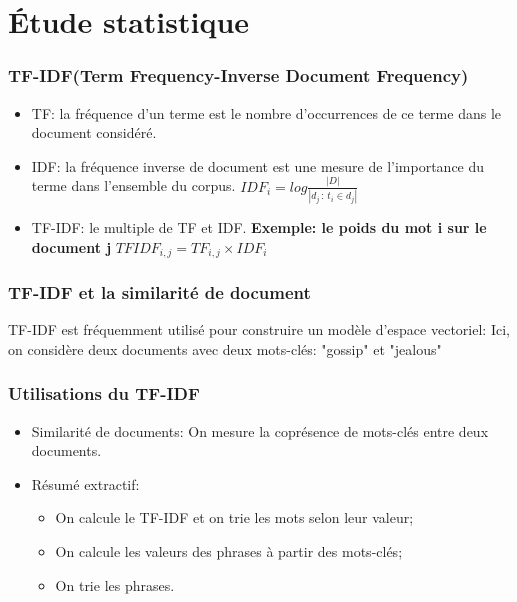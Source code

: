 \documentclass{beamer}
\begin{document}
\section{Étude statistique}
    \begin{frame}
    \frametitle{TF-IDF(Term Frequency-Inverse Document Frequency)}
        \begin{itemize}
            \item TF: la fréquence d'un terme est le nombre d'occurrences de ce terme dans le document considéré.
            \item IDF: la fréquence inverse de document est une mesure de l'importance du terme dans l'ensemble du corpus.
                $IDF_{i}=log \frac{|D|}{|d_{j}\,:\,t_{i}\in d_{j}|}$
            \item TF-IDF: le multiple de TF et IDF.\newline{}
                \textbf{Exemple: le poids du mot i sur le document j}
                $TFIDF_{i,j} = TF_{i,j} \times IDF_{i}$
        \end{itemize}
    \end{frame}

    \begin{frame}
    \frametitle{TF-IDF et la similarité de document}
    TF-IDF est fréquemment utilisé pour construire un modèle d'espace vectoriel:\newline{}
    Ici, on considère deux documents avec deux mots-clés: "gossip" et "jealous"
    \end{frame}

    \begin{frame}
    \frametitle{Utilisations du TF-IDF}
        \begin{itemize}
        \item Similarité de documents:\newline{}
        On mesure la coprésence de mots-clés entre deux documents.
        \item Résumé extractif:
            \begin{itemize}
                \item On calcule le TF-IDF et on trie les mots selon leur valeur;
                \item On calcule les valeurs des phrases à partir des mots-clés;
                \item On trie les phrases.
            \end{itemize}
        \end{itemize}
    \end{frame}
\end{document}
